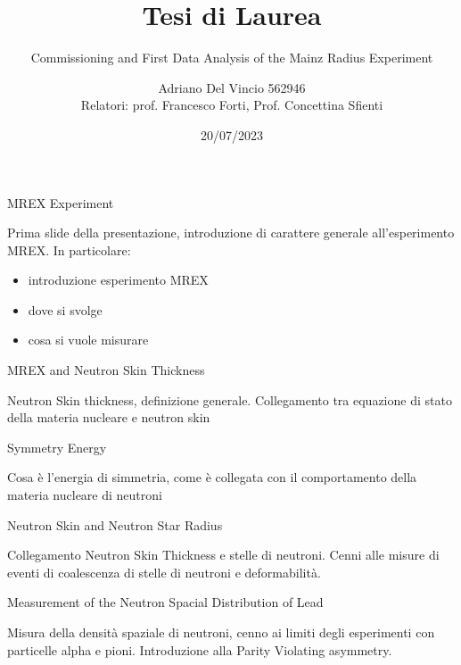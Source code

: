 \documentclass[8pt,a4paper]{beamer}
\author[Adriano Del Vincio]{Adriano Del Vincio 562946\\ \footnotesize Relatori: prof. Francesco Forti, Prof. Concettina Sfienti}
\institute[Università di Pisa]{\textbf {Università di Pisa}}
\title{Tesi di Laurea}
\subtitle{Commissioning and First Data Analysis of the Mainz Radius Experiment}
\date{20/07/2023}
\begin{document}
\frame{\titlepage}

\begin{frame}{MREX Experiment}

Prima slide della presentazione, introduzione di carattere generale all'esperimento MREX. In particolare:

\begin{itemize}
\item introduzione esperimento MREX
\item dove si svolge
\item cosa si vuole misurare
\end{itemize}
\end{frame}


\begin{frame}{MREX and Neutron Skin Thickness}

Neutron Skin thickness, definizione generale. Collegamento tra equazione di stato della materia nucleare e neutron skin

\end{frame}

\begin{frame}{Symmetry Energy}

Cosa è l'energia di simmetria, come è collegata con il comportamento della materia nucleare di neutroni 

\end{frame}

\begin{frame}{Neutron Skin and Neutron Star Radius}

Collegamento Neutron Skin Thickness e stelle di neutroni. Cenni alle misure di eventi di coalescenza di stelle di neutroni e deformabilità.

\end{frame}

\begin{frame}{Measurement of the Neutron Spacial Distribution of Lead}

Misura della densità spaziale di neutroni, cenno ai limiti degli esperimenti con particelle alpha e pioni. Introduzione alla Parity Violating asymmetry.

\end{frame}
\end{document}
